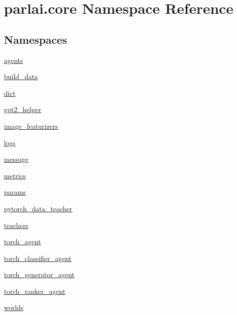 \hypertarget{namespaceparlai_1_1core}{}\section{parlai.\+core Namespace Reference}
\label{namespaceparlai_1_1core}
\subsection*{Namespaces}
\begin{DoxyCompactItemize}
\item 
 \hyperlink{namespaceparlai_1_1core_1_1agents}{agents}
\item 
 \hyperlink{namespaceparlai_1_1core_1_1build__data}{build\+\_\+data}
\item 
 \hyperlink{namespaceparlai_1_1core_1_1dict}{dict}
\item 
 \hyperlink{namespaceparlai_1_1core_1_1gpt2__helper}{gpt2\+\_\+helper}
\item 
 \hyperlink{namespaceparlai_1_1core_1_1image__featurizers}{image\+\_\+featurizers}
\item 
 \hyperlink{namespaceparlai_1_1core_1_1logs}{logs}
\item 
 \hyperlink{namespaceparlai_1_1core_1_1message}{message}
\item 
 \hyperlink{namespaceparlai_1_1core_1_1metrics}{metrics}
\item 
 \hyperlink{namespaceparlai_1_1core_1_1params}{params}
\item 
 \hyperlink{namespaceparlai_1_1core_1_1pytorch__data__teacher}{pytorch\+\_\+data\+\_\+teacher}
\item 
 \hyperlink{namespaceparlai_1_1core_1_1teachers}{teachers}
\item 
 \hyperlink{namespaceparlai_1_1core_1_1torch__agent}{torch\+\_\+agent}
\item 
 \hyperlink{namespaceparlai_1_1core_1_1torch__classifier__agent}{torch\+\_\+classifier\+\_\+agent}
\item 
 \hyperlink{namespaceparlai_1_1core_1_1torch__generator__agent}{torch\+\_\+generator\+\_\+agent}
\item 
 \hyperlink{namespaceparlai_1_1core_1_1torch__ranker__agent}{torch\+\_\+ranker\+\_\+agent}
\item 
 \hyperlink{namespaceparlai_1_1core_1_1worlds}{worlds}
\end{DoxyCompactItemize}
